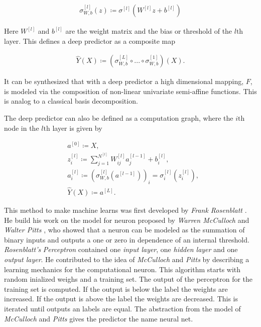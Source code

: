 \documentclass[12pt, a4paper]{thesis}
\begin{document}
\begin{align}
\sigma^{[l]}_{W,b}(z) \coloneqq \sigma^{[l]}\left(W^{[l]} z + b^{[l]} \right)
\end{align}

Here \(W^{[l]}\) and \(b^{[l]}\) are the weight matrix and the bias or threshold of
the \(l\text{th}\) layer.  This defines a deep predictor as a composite map

\begin{align}
\hat{Y}(X) \coloneqq \left( \sigma^{[L]}_{W,b} \circ ... \circ \sigma^{[1]}_{W,b}  \right) (X).
\end{align}

It can be synthesized that with a deep predictor a high dimensional mapping, \(F\), is
modeled via the composition of non-linear univariate semi-affine functions. This
is analog to a classical basis decomposition.

The deep predictor can also be defined as a computation graph, where the
\(i\text{th}\) node in the \(l\text{th}\) layer is given by

\begin{align}
&a^{[0]} \coloneqq X, \\
&z^{[l]}_{i} \coloneqq \sum_{j=1}^{N^{[l]}} W^{[l]}_{ij} a^{[l-1]}_{j} + b^{[l]}_{i}, \label{z-def}\\
&a^{[l]}_{i} \coloneqq \left(\sigma^{[l]}_{W,b}(a^{[l-1]})\right)_{i} = \sigma^{[l]}_{i}(z^{[l]}_{i}), \label{forward}\\
&\hat{Y}(X) \coloneqq a^{[L]}.
\end{align}

This method to make machine learns was first developed by \emph{Frank Rosenblatt}
\cite{rosenblatt58_percep}. He build his work on the model for neuron proposed by
\emph{Warren McCulloch} and \emph{Walter Pitts} \cite{mcculloch43}, who showed that a neuron
can be modeled as the summation of binary inputs and outputs a one or zero in
dependence of an internal threshold. \emph{Rosenblatt's} \emph{Perceptron} contained one
\emph{input layer}, one \emph{hidden layer} and one \emph{output layer}. He contributed to the
idea of \emph{McCulloch} and \emph{Pitts} by describing a learning mechanics for the
computational neuron. This algorithm starts with random inialized weighs and a
training set. The output of the perceptron for the training set is computed. If
the output is below the label the weights are increased. If the output is above
the label the weights are decreased. This is iterated until outputs an labels
are equal. The abstraction from the model of \emph{McCulloch} and \emph{Pitts} gives the
predictor the name neural net.
\end{document}
